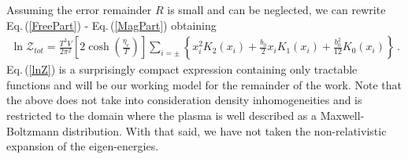 \documentclass[universe,article,submit,moreauthors,pdftex,a4paper]{Definitions/mdpi}
\newcommand{\req}[1]{Eq.\,(\ref{#1})}
\begin{document}
Assuming the error remainder $R$ is small and can be neglected, we can rewrite \req{FreePart} - \req{MagPart} obtaining
\begin{align}
  \label{lnZ}
  \ln\mathcal{Z}_{tot}=\frac{T^3V}{2\pi^2}\left[2\cosh\left(\frac{\eta_{e}}{T}\right)\right]\sum_{i=\pm}\left\{x_i^{2} K_2\left(x_i\right)+\frac{b_0}{2}x_iK_1\left(x_i\right)+\frac{b^2_0}{12}K_0\left(x_i\right)\right\}\,.
\end{align}
\req{lnZ} is a surprisingly compact expression containing only tractable functions and will be our working model for the remainder of the work. Note that the above does not take into consideration density inhomogeneities and is restricted to the domain where the plasma is well described as a Maxwell-Boltzmann distribution. With that said, we have not taken the non-relativistic expansion of the eigen-energies.
\end{document}
